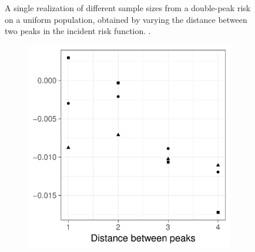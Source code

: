 \begin{figure}[htbp]
\begin{subfigure}{0.45\textwidth}
        \label{fig:one_sample:p1.4_100_G:4}
    \end{subfigure}
    \caption[Examples showing distance between two peaks]
        {A single realization of different sample sizes from a double-peak risk on a uniform population, obtained by varying the distance between two peaks in the incident risk function. \scatterplotcaption.}
    \label{fig:one_sample:p1.4_100_G}
\end{figure}


\begin{figure}[htbp]
    \centering
    \begin{subfigure}[b]{0.49\textwidth}
        \includegraphics[width=\textwidth]{results/by_two_peaks/peak-bias-vs-risk-peak-gap}
        \caption{}
        \label{fig:other_measures:p1.4_100_G:peak_bias}
    \end{subfigure}
    \begin{subfigure}[b]{0.49\textwidth}

\end{subfigure}
\end{figure}
